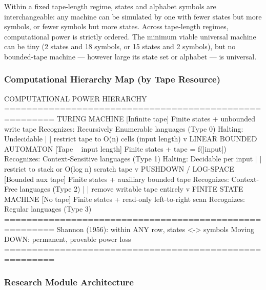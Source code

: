 \documentclass[11pt,letterpaper]{article}
\begin{document}
Within a fixed tape-length regime, states and alphabet symbols are interchangeable: any machine can be simulated by one with fewer states but more symbols, or fewer symbols but more states. Across tape-length regimes, computational power is strictly ordered. The minimum viable universal machine can be tiny (2 states and 18 symbols, or 15 states and 2 symbols), but no bounded-tape machine --- however large its state set or alphabet --- is universal.

\subsubsection{Computational Hierarchy Map (by Tape Resource)}

\begin{asciibox}
COMPUTATIONAL POWER HIERARCHY
=======================================================
  TURING MACHINE                [Infinite tape]
  Finite states + unbounded write tape
  Recognizes: Recursively Enumerable languages (Type 0)
  Halting: Undecidable
     |
     | restrict tape to O(n) cells (input length)
     v
  LINEAR BOUNDED AUTOMATON      [Tape ~ input length]
  Finite states + tape = f(|input|)
  Recognizes: Context-Sensitive languages (Type 1)
  Halting: Decidable per input
     |
     | restrict to stack or O(log n) scratch tape
     v
  PUSHDOWN / LOG-SPACE          [Bounded aux tape]
  Finite states + auxiliary bounded tape
  Recognizes: Context-Free languages (Type 2)
     |
     | remove writable tape entirely
     v
  FINITE STATE MACHINE          [No tape]
  Finite states + read-only left-to-right scan
  Recognizes: Regular languages (Type 3)
=======================================================
  Shannon (1956): within ANY row, states <-> symbols
  Moving DOWN: permanent, provable power loss
=======================================================
\end{asciibox}

\subsubsection{Research Module Architecture}
\end{document}
